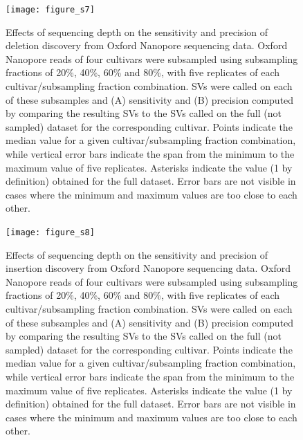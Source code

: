 \documentclass[12pt]{article}
\newenvironment{cfigure}
	{\begin{figure} \centering}
	{\end{figure}}
\begin{document}
\clearpage%

\begin{cfigure}
	\texttt{[image: figure\_s7]}

	\caption[Effects of sequencing depth on the sensitivity and precision of deletion discovery from Oxford Nanopore sequencing data]{
		Effects of sequencing depth on the sensitivity and precision of deletion discovery from Oxford Nanopore sequencing data.
		Oxford Nanopore reads of four cultivars were subsampled using subsampling fractions of 20\%, 40\%, 60\% and 80\%, with five replicates of each cultivar/subsampling fraction combination.
		SVs were called on each of these subsamples and (A) sensitivity and (B) precision computed by comparing the resulting SVs to the SVs called on the full (not sampled) dataset for the corresponding cultivar.
		Points indicate the median value for a given cultivar/subsampling fraction combination, while vertical error bars indicate the span from the minimum to the maximum value of five replicates.
		Asterisks indicate the value (1 by definition) obtained for the full dataset.
		Error bars are not visible in cases where the minimum and maximum values are too close to each other.
}

\label{fig_s7}

\end{cfigure}

\clearpage%

\begin{cfigure}
	\texttt{[image: figure\_s8]}

	\caption[Effects of sequencing depth on the sensitivity and precision of insertion discovery from Oxford Nanopore sequencing data]{
		Effects of sequencing depth on the sensitivity and precision of insertion discovery from Oxford Nanopore sequencing data.
		Oxford Nanopore reads of four cultivars were subsampled using subsampling fractions of 20\%, 40\%, 60\% and 80\%, with five replicates of each cultivar/subsampling fraction combination.
		SVs were called on each of these subsamples and (A) sensitivity and (B) precision computed by comparing the resulting SVs to the SVs called on the full (not sampled) dataset for the corresponding cultivar.
		Points indicate the median value for a given cultivar/subsampling fraction combination, while vertical error bars indicate the span from the minimum to the maximum value of five replicates.
		Asterisks indicate the value (1 by definition) obtained for the full dataset.
		Error bars are not visible in cases where the minimum and maximum values are too close to each other.
}

\label{fig_s8}

\end{cfigure}
\end{document}

